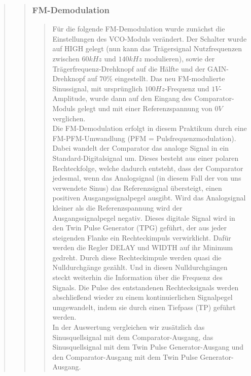 \begin{quote}
\begin{quote}
        \subsubsection{FM-Demodulation}
        \begin{quote}
        Für die folgende FM-Demodulation wurde zunächst die Einstellungen des VCO-Moduls verändert. Der Schalter wurde
        auf HIGH gelegt (nun kann das Trägersignal Nutzfrequenzen zwischen $60 kHz$ und $140 kHz$ modulieren), sowie der
        Trägerfrequenz-Drehknopf auf die Hälfte und der GAIN-Drehknopf auf $70 \%$ eingestellt. Das neu FM-modulierte
        Sinussignal, mit ursprünglich $100 Hz$-Frequenz und $1 V$-Amplitude, wurde dann auf den Eingang des
        Comparator-Moduls gelegt und mit einer Referenzspannung von $0 V$ verglichen.\\
        
        Die FM-Demodulation erfolgt in diesem Praktikum durch eine FM-PFM-Umwandlung (PFM = Pulsfrequenzmodulation).
        Dabei wandelt der Comparator das analoge Signal in ein Standard-Digitalsignal um. Dieses besteht aus einer
        polaren Rechteckfolge, welche dadurch entsteht, dass der Comparator jedesmal, wenn das Analogsignal (in diesem
        Fall der von uns verwendete Sinus) das Referenzsignal übersteigt, einen positiven Ausgangssignalpegel ausgibt.
        Wird das Analogsignal kleiner als die Referenzspannung wird der Ausgangssignalpegel negativ. Dieses digitale
        Signal wird in den Twin Pulse Generator (TPG) geführt, der aus jeder steigenden Flanke ein Rechteckimpuls
        verwirklicht. Dafür werden die Regler DELAY und WIDTH auf ihr Minimum gedreht. Durch diese Rechteckimpule werden
        quasi die Nulldurchgänge gezählt. Und in diesen Nulldurchgängen steckt weiterhin die Information über die
        Frequenz des Signals. Die Pulse des entstandenen Rechtecksignals werden abschließend wieder zu einem
        kontinuierlichen Signalpegel umgewandelt, indem sie durch einen Tiefpass (TP) geführt werden.\\
        
        In der Auswertung vergleichen wir zusätzlich das Sinusquellsignal mit dem Comparator-Ausgang, das
        Sinusquellsignal mit dem Twin Pulse Generator-Ausgang und den Comparator-Ausgang mit dem Twin Pulse
        Generator-Ausgang.
         
        \end{quote}
        
    \end{quote}
    

\end{quote}
